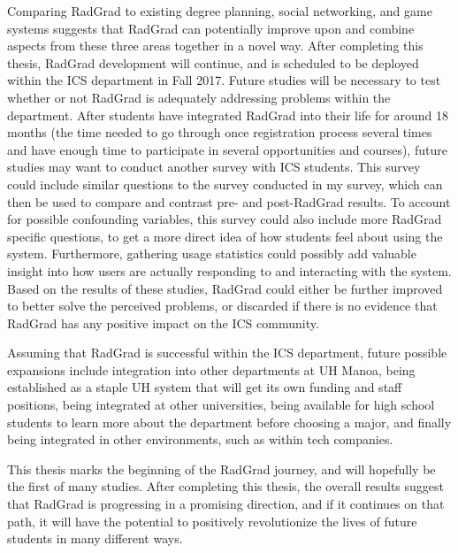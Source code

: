 Comparing RadGrad to existing degree planning, social networking, and game systems suggests that RadGrad can potentially improve upon and combine aspects from these three areas together in a novel way. After completing this thesis, RadGrad development will continue, and is scheduled to be deployed within the ICS department in Fall 2017. Future studies will be necessary to test whether or not RadGrad is adequately addressing problems within the department. After students have integrated RadGrad into their life for around 18 months (the time needed to go through once registration process several times and have enough time to participate in several opportunities and courses), future studies may want to conduct another survey with ICS students. This survey could include similar questions to the survey conducted in my survey, which can then be used to compare and contrast pre- and post-RadGrad results. To account for possible confounding variables, this survey could also include more RadGrad specific questions, to get a more direct idea of how students feel about using the system. Furthermore, gathering usage statistics could possibly add valuable insight into how users are actually responding to and interacting with the system. Based on the results of these studies, RadGrad could either be further improved to better solve the perceived problems, or discarded if there is no evidence that RadGrad has any positive impact on the ICS community.

Assuming that RadGrad is successful within the ICS department, future possible expansions include integration into other departments at UH Manoa, being established as a staple UH system that will get its own funding and staff positions, being integrated at other universities, being available for high school students to learn more about the department before choosing a major, and finally being integrated in other environments, such as within tech companies. 

This thesis marks the beginning of the RadGrad journey, and will hopefully be the first of many studies. After completing this thesis, the overall results suggest that RadGrad is progressing in a promising direction, and if it continues on that path, it will have the potential to positively revolutionize the lives of future students in many different ways.   